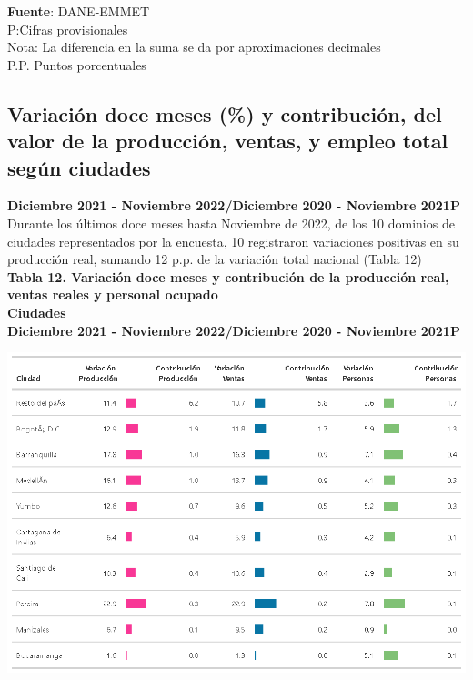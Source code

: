 \documentclass[
]{article}
\begin{document}
\textbf{Fuente}: DANE-EMMET\\
P:Cifras provisionales\\
Nota: La diferencia en la suma se da por aproximaciones decimales\\
P.P. Puntos porcentuales\\

\hypertarget{variaciuxf3n-doce-meses-y-contribuciuxf3n-del-valor-de-la-producciuxf3n-ventas-y-empleo-total-seguxfan-ciudades}{%
\subsection{Variación doce meses (\%) y contribución, del valor de la
producción, ventas, y empleo total según
ciudades}\label{variaciuxf3n-doce-meses-y-contribuciuxf3n-del-valor-de-la-producciuxf3n-ventas-y-empleo-total-seguxfan-ciudades}}

\textbf{Diciembre 2021 - Noviembre 2022/Diciembre 2020 - Noviembre
2021P}\\

Durante los últimos doce meses hasta Noviembre de 2022, de los 10
dominios de ciudades representados por la encuesta, 10 registraron
variaciones positivas en su producción real, sumando 12 p.p. de la
variación total nacional (Tabla 12)\\

\textbf{Tabla 12. Variación doce meses y contribución de la producción
real, ventas reales y personal ocupado}\\
\textbf{Ciudades}\\
\textbf{Diciembre 2021 - Noviembre 2022/Diciembre 2020 - Noviembre
2021P}\\

\begin{center}\includegraphics[width=12.58in]{tabla12_1} \end{center}
\end{document}
